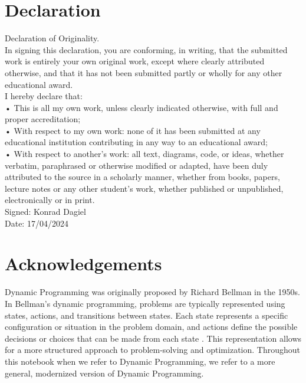 \documentclass[12pt]{report}
\theoremstyle{definition}
\begin{document}
\chapter*{Declaration}
Declaration of Originality.\\
In signing this declaration, you are conforming, in writing, that the submitted work is entirely your own original work, except where clearly attributed otherwise, and that it has not been submitted partly or wholly for
any other educational award.\\
I hereby declare that:\\
• This is all my own work, unless clearly indicated otherwise, with full
and proper accreditation;\\
• With respect to my own work: none of it has been submitted at any educational institution contributing in any way to an educational award;\\
• With respect to another's work: all text, diagrams, code, or ideas,
whether verbatim, paraphrased or otherwise modified or adapted, have
been duly attributed to the source in a scholarly manner, whether
from books, papers, lecture notes or any other student's work, whether
published or unpublished, electronically or in print.\\
Signed: Konrad Dagiel\\
Date: 17/04/2024

\chapter*{Acknowledgements}
Dynamic Programming was originally proposed by Richard Bellman in the 1950s.
In Bellman's dynamic programming, problems are typically represented using states, actions, and transitions between states.
Each state represents a specific configuration or situation in the problem domain, and actions define the possible decisions or choices that can be made from each state \cite{bellman1954theory}.
This representation allows for a more structured approach to problem-solving and optimization.
Throughout this notebook when we refer to Dynamic Programming, we refer to a more general, modernized version of Dynamic Programming.

\tableofcontents









\end{document}
